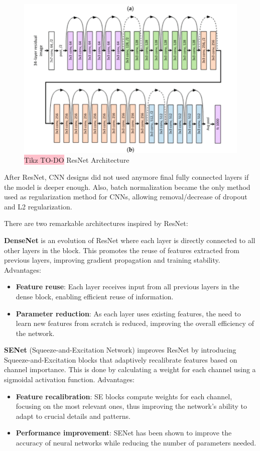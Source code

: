 \begin{figure}[!htbp]
    \centering
    \includegraphics[width=\textwidth]{tikz/chapter5 - ResNet.png}
    \caption{{\color{red}\colorbox{pink}{Tikz TO-DO}} ResNet Architecture}
\end{figure}

After ResNet, CNN designs did not used anymore final fully connected layers if the model is deeper enough. Also, batch normalization became the only method used as regularization method for CNNs, allowing removal/decrease of dropout and L2 regularization.

There are two remarkable architectures inspired by ResNet: 

\textbf{DenseNet} is an evolution of ResNet where each layer is directly connected to all other layers in the block. This promotes the reuse of features extracted from previous layers, improving gradient propagation and training stability. Advantages:
\begin{itemize}
    \item \textbf{Feature reuse}: Each layer receives input from all previous layers in the dense block, enabling efficient reuse of information.
    \item \textbf{Parameter reduction}: As each layer uses existing features, the need to learn new features from scratch is reduced, improving the overall efficiency of the network.
\end{itemize}

\textbf{SENet} (Squeeze-and-Excitation Network) improves ResNet by introducing Squeeze-and-Excitation blocks that adaptively recalibrate features based on channel importance. This is done by calculating a weight for each channel using a sigmoidal activation function. Advantages:
\begin{itemize}
    \item \textbf{Feature recalibration}: SE blocks compute weights for each channel, focusing on the most relevant ones, thus improving the network's ability to adapt to crucial details and patterns.
    \item \textbf{Performance improvement}: SENet has been shown to improve the accuracy of neural networks while reducing the number of parameters needed.
\end{itemize}

